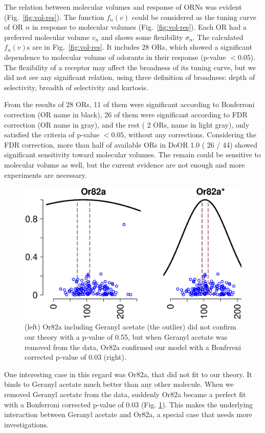 \documentclass[11pt]{paper} %
\newcommand{\numberofreceptors}{ 28 }
\newcommand{\bonferroni}{ 11 }
\newcommand{\fdr}{ 26 }
\newcommand{\nocorrection}{ 2 }
\begin{document}

The relation between molecular volumes and response of ORNs was evident (Fig.~\ref{fig:vol-res}). 
The function $f_n(v)$ could be considered as the tuning curve of OR $n$ in response to molecular volumes (Fig.~\ref{fig:vol-res}). 
Each OR had a preferred molecular volume $v_n$ and shows some flexibility $\sigma_n$. 
The calculated $f_n(v)$s are in  Fig.~\ref{fig:vol-res}. 
It includes \numberofreceptors ORs, 
which showed a significant dependence to molecular volume of odorants in their response (p-value $<0.05$). 
The flexibility of a receptor may affect the broadness of its tuning curve, 
but we did not see any significant relation, 
using three definition of broadness: depth of selectivity, breadth of selectivity and kurtosis.

From the results of \numberofreceptors ORs, 
\bonferroni of them were significant according to Bonferroni correction (OR name in black), 
\fdr of them were significant according to FDR correction (OR name in gray), 
and the rest (\nocorrection ORs, name in light gray), 
only satisfied the criteria of p-value $<0.05$, without any corrections.
Considering the FDR correction, 
more than half of available ORs in DoOR 1.0 (\fdr / 44) showed significant sensitivity toward molecular volumes. 
The remain could be sensitive to molecular volume as well, 
but the current evidence are not enough and more experiments are necessary. 

\begin{figure}
	\centering
	\includegraphics[width= 0.75 \textwidth]{vol-res-Or82a.eps}
	\caption{(left) Or82a including Geranyl acetate (the outlier) did not confirm our theory with a p-value of 0.55, but when Geranyl acetate was removed from the data, 
	Or82a confirmed our model with a Bonfrreni corrected p-value of 0.03 (right).}
	\label{fig:Or82a}
\end{figure}
One interesting case in this regard was Or82a, that did not fit to our theory. 
It binds to Geranyl acetate much better than any other molecule. 
When we removed Geranyl acetate from the data, suddenly Or82a became a perfect fit with a Bonferroni corrected p-value of 0.03 (Fig. \ref{fig:Or82a}). 
This makes the underlying interaction between Geranyl acetate and Or82a, a special case that needs more investigations.
\end{document}

